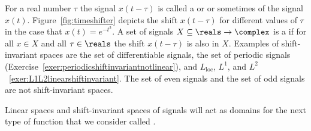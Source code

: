 For a real number $\tau$ the signal $x(t - \tau)$ is called a  or  or sometimes  of the signal $x(t)$.  Figure~\ref{fig:timeshifter} depicts the shift $x(t - \tau)$ for different values of $\tau$ in the case that $x(t) = e^{-t^2}$.   A set of signals $X \subseteq \reals \to \complex$ is a  if for all $x \in X$ and all $\tau \in \reals$ the shift $x(t - \tau)$ is also in $X$.  Examples of shift-invariant spaces are the set of differentiable signals, the set of periodic signals (Exercise~\ref{exer:periodicshiftinvariantnotlinear}), and $L_{\text{loc}}$, $L^1$, and $L^2$~\eqref{exer:L1L2linearshiftinvariant}.  The set of even signals and the set of odd signals are not shift-invariant spaces.

Linear spaces and shift-invariant spaces of signals will act as domains for the next type of function that we consider called .

